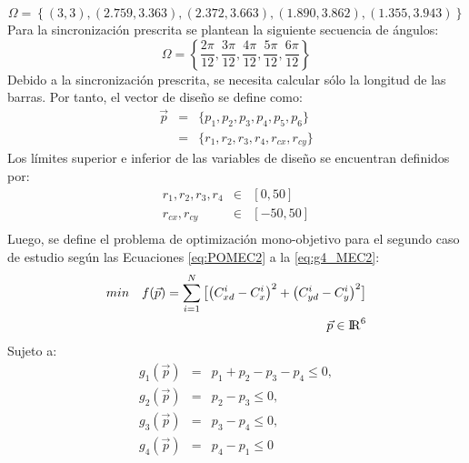 \begin{equation}\label{eq:Puntos de Presicion MEC2}
\Omega = \left \{ (3, 3), (2.759, 3.363), (2.372, 3.663), (1.890, 3.862), (1.355, 3.943)\right\} 
\end{equation}
Para la sincronización prescrita se plantean la siguiente secuencia de ángulos:
\begin{equation}\label{eq:Angulos MEC2}
\Omega = \left \{ \frac{2\pi}{12},\frac{3\pi}{12},\frac{4\pi}{12},\frac{5\pi}{12},\frac{6\pi}{12}\right\} 
\end{equation}
Debido a la sincronización prescrita, se necesita calcular sólo la longitud de las barras. Por tanto, el vector de diseño se define como:
\begin{eqnarray}\label{eq:Vector variables MEC2}
\vec{p} &=& \{p_1,p_2,p_3,p_{4},p_{5},p_{6} \}\\
       &=& \{ r_1,r_2,r_3,r_4,r_{cx},r_{cy} \} 
\end{eqnarray}
Los límites superior e inferior de las variables de diseño se encuentran definidos
por:
\begin{eqnarray}\label{eq:limites variables MEC2}
r_1,r_2,r_3,r_4& \in & \left[ 0,50\right] \\
r_{cx},r_{cy} & \in & \left[ -50,50\right] \\
\end{eqnarray}
Luego, se define el problema de optimización mono-objetivo para el segundo caso de estudio según las Ecuaciones \ref{eq:POMEC2} a la \ref{eq:g4_MEC2}:
\begin{equation}\label{eq:POMEC2}
 \begin{aligned}
min\quad  f(\vec{p})=
\sum_{i=1}^{N}\big[\big(C^{i}_{xd}-C^{i}_{x} \big)^2 +\big(C^{i}_{yd}-C^{i}_{y} \big)^2\big]
\\
\vec{p} \in  {\rm I\!R}^{6}
\\
\end{aligned}
\end{equation}
Sujeto a:
\begin{eqnarray}\label{eq:Restricciones MEC2}
g_{1}(\vec{p})&=&p_{1}+ p_{2}-p_{3}-p_{4} \leq 0,\\
g_{2}(\vec{p})&=&p_{2}-p_{3} \leq 0,\\
g_{3}(\vec{p})&=&p_{3}-p_{4} \leq 0,\\
g_{4}(\vec{p})&=&p_{4}-p_{1} \leq 0 \label{eq:g4_MEC2}
\end{eqnarray}


